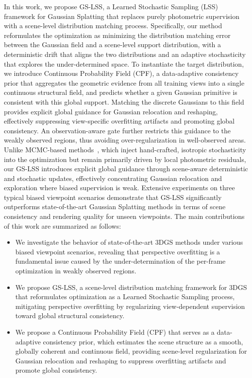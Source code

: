 \documentclass[lettersize,journal]{IEEEtran}
\begin{document}
In this work, we propose GS-LSS, a Learned Stochastic Sampling (LSS) framework for Gaussian Splatting that 
replaces purely photometric supervision with a scene-level distribution matching process. 
Specifically, our method reformulates the optimization as minimizing the distribution matching error between the Gaussian field and a scene-level support distribution, with a deterministic drift that aligns the two distributions and an adaptive stochasticity that explores the under-determined space.
To instantiate the target distribution, we introduce Continuous Probability Field (CPF), a data-adaptive consistency prior that aggregates the geometric evidence from all training views into a single continuous structural field, and predicts whether a given Gaussian primitive is consistent with this global support. 
Matching the discrete Gaussians to this field provides explicit global guidance for Gaussian relocation and reshaping, effectively suppressing view-specific overfitting artifacts and promoting global consistency. 
An observation-aware gate further restricts this guidance to the weakly observed regions, thus avoiding over-regularization in well-observed areas.
Unlike MCMC-based methods~\cite{mcmc,mh3dgs}, which inject hand-crafted, isotropic stochasticity into the optimization but remain primarily driven by local photometric residuals, our GS-LSS introduces explicit global guidance through scene-aware deterministic and stochastic updates, effectively concentrating Gaussian relocation and exploration where biased supervision is weak.
Extensive experiments on three typical biased viewpoint scenarios demonstrate that GS-LSS significantly outperforms state-of-the-art Gaussian Splatting methods in terms of scene consistency and rendering quality for unseen viewpoints. 
The main contributions of this work are summarized as follows:
\begin{itemize}
    \item We investigate the behavior of state-of-the-art 3DGS methods under various biased viewpoint scenarios, revealing that perspective overfitting is a fundamental issue caused by the under-determination of the per-frame optimization in weakly observed regions.
    \item We propose GS-LSS, a scene-level distribution matching framework for 3DGS that reformulates optimization as a Learned Stochastic Sampling process, 
    mitigating perspective overfitting by regularizing view-dependent supervision toward global structural consistency.
    \item We propose a Continuous Probability Field (CPF) that serves as a data-adaptive consistency prior, which estimates the scene structure as a smooth, globally coherent and continuous field, providing scene-level regularization for Gaussian relocation and reshaping to suppress overfitting artifacts and promote global consistency.
\end{itemize}
\end{document}
